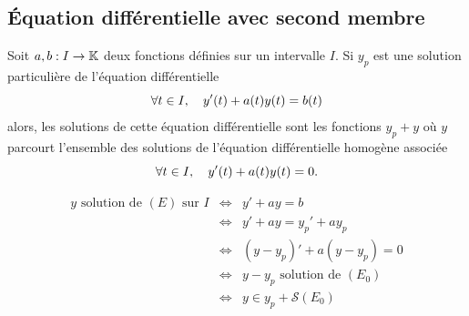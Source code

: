 \documentclass{magnolia}
\begin{document}
\subsection{Équation différentielle avec second membre}

\begin{proposition}[utile=-3,nom={Théorème de superposition}]
Soit $a,b:I\to\mathbb{K}$ deux fonctions définies sur un intervalle $I$. Si
$y_p$ est une solution \og particulière \fg de l'équation différentielle
\[\forall t\in I,\quad y'(t)+a(t) y(t)=b(t)\]
alors, les solutions de cette équation différentielle sont les fonctions $y_p+y$
où $y$ parcourt l'ensemble des solutions de l'équation différentielle homogène
associée
\[\forall t\in I ,\quad y'(t)+a(t) y(t)=0.\]
\end{proposition}

\begin{preuve}
\begin{eqnarray*}
y \text{ solution de } (E) \text{ sur } I&\Longleftrightarrow & y'+ay=b \\
&\Longleftrightarrow & y'+ay=y_p'+ay_p \\
&\Longleftrightarrow &(y-y_p)'+a(y-y_p)=0\\
&\Longleftrightarrow & y-y_p \text{ solution de } (E_0)\\
&\Longleftrightarrow & y\in y_p+\mathcal{S}(E_0)
\end{eqnarray*}

\end{preuve}
\end{document}
